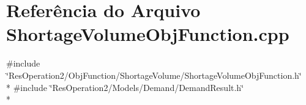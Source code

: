 \section{Referência do Arquivo Shortage\+Volume\+Obj\+Function.\+cpp}
\label{_2_obj_function_2_shortage_volume_2_shortage_volume_obj_function_8cpp}
{\ttfamily \#include \char`\"{}Res\+Operation2/\+Obj\+Function/\+Shortage\+Volume/\+Shortage\+Volume\+Obj\+Function.\+h\char`\"{}}\\*
{\ttfamily \#include \char`\"{}Res\+Operation2/\+Models/\+Demand/\+Demand\+Result.\+h\char`\"{}}\\*
